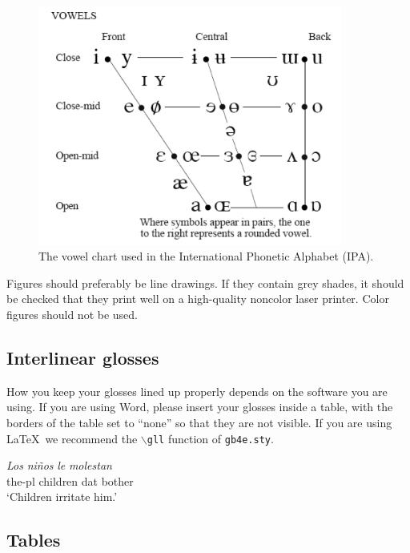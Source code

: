 \documentclass[11pt]{article}
\begin{document}
\begin{figure}[!ht]
\begin{center}
\includegraphics[width=10cm]{ipa}
\caption{The vowel chart used in the International Phonetic Alphabet (IPA).}\label{fig:vowels}
\end{center}
\end{figure}

Figures should preferably be line drawings. If they contain grey shades, it
should be checked that they print well on a high-quality noncolor laser printer.
Color figures should not be used.


\subsection{Interlinear glosses}

How you keep your glosses lined up properly depends on the software you are
using. If you are using Word, please insert your glosses inside a table, with
the borders of the table set to ``none'' so that they are not visible. If you
are using \LaTeX\, we recommend the \texttt{$\backslash$gll} function of
\texttt{gb4e.sty}.

\begin{exe}
\ex
\gll \textit{Los} \textit{niños} \textit{le} \textit{molestan}\\
the-{\sc pl} children {\sc dat} bother\\
\trans `Children irritate him.'
\end{exe}



\subsection{Tables}
\end{document}

